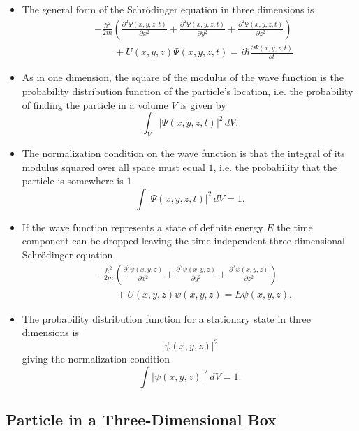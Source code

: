 \documentclass{article}
\begin{document}
\begin{itemize}
  \item The general form of the Schrödinger equation in three dimensions is \begin{align*}
           & -\frac{\hbar^2}{2 m} \left( \frac{\partial^2 \Psi(x, y, z, t)}{\partial x^2} + \frac{\partial^2 \Psi(x, y, z, t)}{\partial y^2} + \frac{\partial^2 \Psi(x, y, z, t)}{\partial z^2} \right) \\
           & \qquad + U(x, y, z) \Psi(x, y, z, t) = i \hbar \frac{\partial \Psi(x, y, z, t)}{\partial t}
        \end{align*}

  \item As in one dimension, the square of the modulus of the wave function is the probability distribution function of the particle's location, i.e. the probability of finding the particle in a volume $V$ is given by \[\int_V |\Psi(x, y, z, t)|^2 \,dV.\]

  \item The normalization condition on the wave function is that the integral of its modulus squared over all space must equal $1$, i.e. the probability that the particle is somewhere is $1$ \[\int |\Psi(x, y, z, t)|^2 \,dV = 1.\]

  \item If the wave function represents a state of definite energy $E$ the time component can be dropped leaving the time-independent three-dimensional Schrödinger equation \begin{align*}
           & -\frac{\hbar^2}{2 m} \left( \frac{\partial^2 \psi(x, y, z)}{\partial x^2} + \frac{\partial^2 \psi(x, y, z)}{\partial y^2} + \frac{\partial^2 \psi(x, y, z)}{\partial z^2} \right) \\
           & \qquad + U(x, y, z) \psi(x, y, z) = E \psi(x, y, z).
        \end{align*}

  \item The probability distribution function for a stationary state in three dimensions is \[|\psi(x, y, z)|^2\] giving the normalization condition \[\int |\psi(x, y, z)|^2 \,dV = 1.\]
\end{itemize}

\subsection{Particle in a Three-Dimensional Box}
\end{document}
